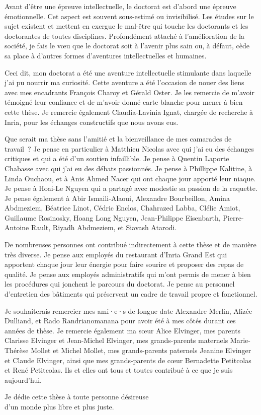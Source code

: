 \begin{ThesisAcknowledgments}
Avant d'être une épreuve intellectuelle, le doctorat est d'abord une épreuve émotionnelle.
Cet aspect est souvent sous-estimé ou invisibilisé.
Les études sur le sujet existent et mettent en exergue le mal-être qui touche les doctorants et les doctorantes de toutes disciplines.
Profondément attaché à l'amélioration de la société, je fais le vœu que le doctorat soit à l'avenir plus sain ou, à défaut, cède sa place à d'autres formes d'aventures intellectuelles et humaines.

Ceci dit, mon doctorat a été une aventure intellectuelle stimulante dans laquelle j'ai pu nourrir ma curiosité.
Cette aventure a été l'occasion de nouer des liens avec mes encadrants François Charoy et Gérald Oster.
Je les remercie de m'avoir témoigné leur confiance et de m'avoir donné carte blanche pour mener à bien cette thèse.
Je remercie également Claudia-Lavinia Ignat, chargée de recherche à Inria, pour les échanges constructifs que nous avons eus.

Que serait ma thèse sans l'amitié et la bienveillance de mes camarades de travail~?
Je pense en particulier à Matthieu Nicolas avec qui j'ai eu des échanges critiques et qui a été d'un soutien infaillible.
Je pense à Quentin Laporte Chabasse avec qui j'ai eu des débats passionnés.
Je pense à Phillippe Kalitine, à Linda Ouchaou, et à Anis Ahmed Nacer qui ont chaque jour apporté leur niaque.
Je pense à Hoai-Le Nguyen qui a partagé avec modestie sa passion de la raquette.
Je pense également à Abir Ismaili-Alaoui, Alexandre Bourbeillon, Amina Abdmeziem, Béatrice Linot, Cédric Enclos, Chahrazed Labba, Clélie Amiot, Guillaume Rosinosky, Hoang Long Nguyen, Jean-Philippe Eisenbarth, Pierre-Antoine Rault, Riyadh Abdmeziem, et Siavash Atarodi.

De nombreuses personnes ont contribué indirectement à cette thèse et de manière très diverse.
Je pense aux employés du restaurant d'Inria Grand Est qui apportent chaque jour leur énergie pour faire sourire et proposer des repas de qualité.
Je pense aux employés administratifs qui m'ont permis de mener à bien les procédures qui jonchent le parcours du doctorat.
Je pense au personnel d'entretien des bâtiments qui préservent un cadre de travail propre et fonctionnel.

Je souhaiterais remercier mes ami·e·s de longue date Alexandre Merlin, Alizée Dulliand, et Rado Randrianomanana pour avoir été à mes côtés durant ces années de thèse.
Je remercie également ma sœur Alice Elvinger, mes parents Clarisse Elvinger et Jean-Michel Elvinger, mes grands-parents maternels Marie-Thérèse Mollet et Michel Mollet, mes grands-parents paternels Jeanine Elvinger et Claude Elvinger, ainsi que mes grands-parents de cœur Bernadette Petitcolas et René Petitcolas.
Ils et elles ont tous et toutes contribué à ce que je suis aujourd'hui.
\end{ThesisAcknowledgments}

\begin{ThesisDedication}
    Je dédie cette thèse à toute personne désireuse\\
    d'un monde plus libre et plus juste.
\end{ThesisDedication}
